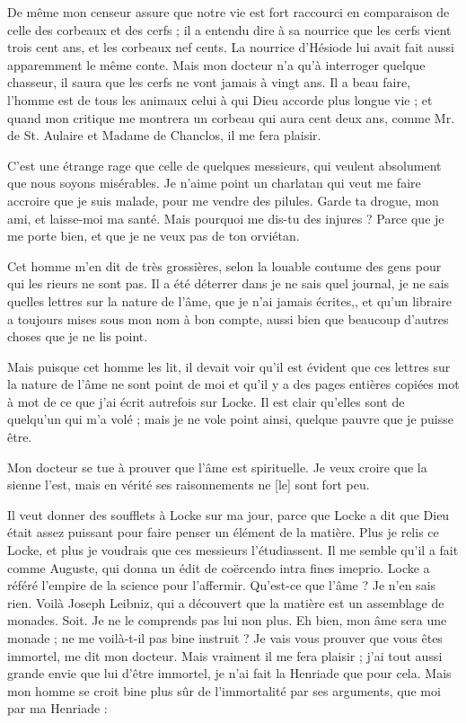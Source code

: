 \documentclass[french,twoside]{book} %
\begin{document}
De même mon censeur assure que notre vie est fort raccourci en comparaison de celle des corbeaux et des cerfs ; il a entendu dire à sa nourrice que les cerfs vient trois cent ans, et les corbeaux nef cents. La nourrice d’Hésiode lui avait fait aussi apparemment le même conte. Mais mon docteur n’a qu’à interroger quelque chasseur, il saura que les cerfs ne vont jamais à vingt ans. Il a beau faire, l’homme est de tous les animaux celui à qui Dieu accorde plus longue vie ; et quand mon critique me montrera un corbeau qui aura cent deux ans, comme Mr. de St. Aulaire et Madame de Chanclos, il me fera plaisir. \par
C’est une étrange rage que celle de quelques messieurs, qui veulent absolument que nous soyons misérables. Je n’aime point un charlatan qui veut me faire accroire que je suis malade, pour me vendre des pilules. Garde ta drogue, mon ami, et laisse-moi ma santé. Mais pourquoi me dis-tu des injures ? Parce que je me porte bien, et que je ne veux pas de ton orviétan.\par
Cet homme m’en dit de très grossières, selon la louable coutume des gens pour qui les rieurs ne sont pas. Il a été déterrer dans je ne sais quel journal, je ne sais quelles lettres sur la nature de l’âme, que je n’ai jamais écrites,, et qu’un libraire a toujours mises sous mon nom à bon compte, aussi bien que beaucoup d’autres choses que je ne lis point.\par
Mais puisque cet homme les lit, il devait voir qu’il est évident que ces lettres sur la nature de l’âme ne sont point de moi et qu’il y a des pages entières copiées mot à mot de ce que j’ai écrit autrefois sur Locke. Il est clair qu’elles sont de quelqu’un qui m’a volé ; mais je ne vole point ainsi, quelque pauvre que je puisse être.\par
Mon docteur se tue à prouver que l’âme est spirituelle. Je veux croire que la sienne l’est, mais en vérité ses raisonnements ne [le] sont fort peu. \par
Il veut donner des soufflets à Locke sur ma jour, parce que Locke a dit que Dieu était assez puissant pour faire penser un élément de la matière. Plus je relis ce Locke, et plus je voudrais que ces messieurs l’étudiassent. Il me semble qu’il a fait comme Auguste, qui donna un édit de coërcendo intra fines imeprio. Locke a référé l’empire de la science pour l’affermir. Qu’est-ce que l’âme ? Je n’en sais rien. Voilà Joseph Leibniz, qui a découvert que la matière est un assemblage de monades. Soit. Je ne le comprends pas lui non plus. Eh bien, mon âme sera une monade ; ne me voilà-t-il pas bine instruit ? Je vais vous prouver que vous êtes immortel, me dit mon docteur. Mais vraiment il me fera plaisir ; j’ai tout aussi grande envie que lui d’être immortel, je n’ai fait la Henriade que pour cela. Mais mon homme se croit bine plus sûr de l’immortalité par ses arguments, que moi par ma Henriade : \par
\end{document}
